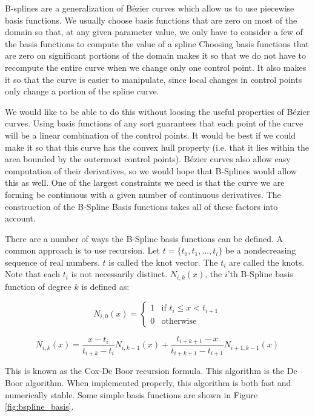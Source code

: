 B-splines are a generalization of B\'{e}zier curves which allow us to use piecewise basis functions.
We usually choose basis functions that are zero on most of the domain so that, at any given parameter value, we only have to consider a few of the basis functions to compute the value of a spline
Choosing basis functions that are zero on significant portions of the domain makes it so that we do not have to recompute the entire curve when we change only one control point.
It also makes it so that the curve is easier to manipulate, since local changes in control points only change a portion of the spline curve.

We would like to be able to do this without loosing the useful properties of B\'{e}zier curves.
Using basis functions of any sort guarantees that each point of the curve will be a linear combination of the control points.
It would be best if we could make it so that this curve has the convex hull property (i.e. that it lies within the area bounded by the outermost control points).
B\'{e}zier curves also allow easy computation of their derivatives, so we would hope that B-Splines would allow this as well.
One of the largest constraints we need is that the curve we are forming be continuous with a given number of continuous derivatives.
The construction of the B-Spline Basis functions takes all of these factors into account.

There are a number of ways the B-Spline basis functions can be defined.
A common approach is to use recursion.
Let $t = \lbrace t_0, t_1, ... , t_l \rbrace$ be a nondecreasing sequence of real numbers.
$t$ is called the knot vector.
The $t_i$ are called the knots.
Note that each $t_i$ is not necessarily distinct.
$N_{i,k}(x)$, the $i$'th B-Spline basis function of degree $k$ is defined as:

\begin{equation*}
N_{i,0}(x) =
\begin{cases}
1 & \text{if } t_i \leq x < t_{i+1} \\
0 & \text{otherwise}
\end{cases}
\end{equation*}

\begin{equation*}
N_{i,k}(x) = \frac{x - t_i}{t_{i+k} - t_i} N_{i,k-1}(x) + \frac{t_{i + k + 1} - x}{t_{i + k + 1} - t_{i + 1}} N_{i+1,k-1}(x)
\end{equation*}

This is known as the Cox-De Boor recursion formula.
This algorithm is the De Boor algorithm.
When implemented properly, this algorithm is both fast and numerically stable.
Some simple basis functions are shown in Figure \ref{fig:bspline_basis}.

